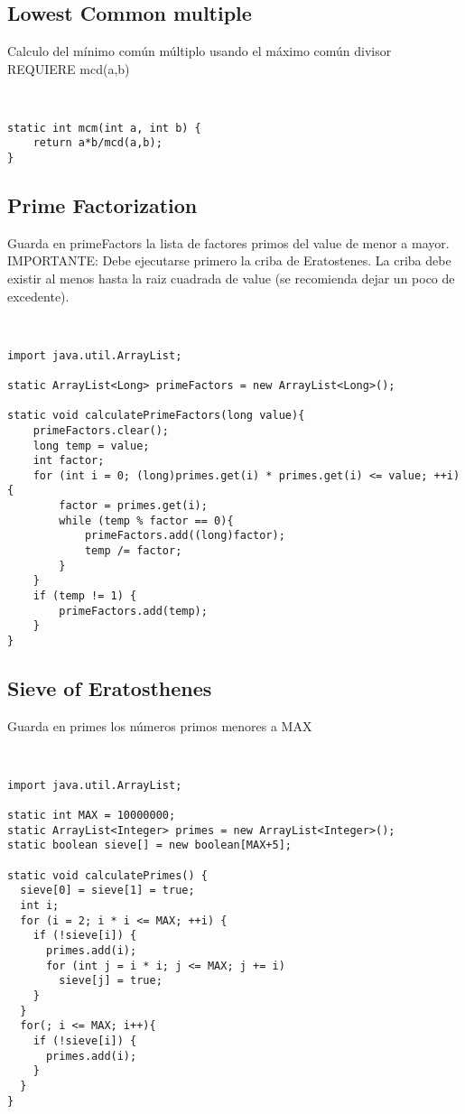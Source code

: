 \documentclass[11pt,letterpaper,twocolumn,twosided]{article}
\begin{document}
\subsection{Lowest Common multiple}
Calculo del m\'inimo com\'un m\'ultiplo usando el m\'aximo com\'un divisor REQUIERE mcd(a,b)
\begin{lstlisting}


static int mcm(int a, int b) {
	return a*b/mcd(a,b);
}
\end{lstlisting}

\subsection{Prime Factorization}
Guarda en primeFactors la lista de factores primos del value de menor a mayor. IMPORTANTE: Debe ejecutarse primero la criba de Eratostenes.  La criba debe existir al menos hasta la raiz cuadrada de value (se  recomienda dejar un poco de excedente).
\begin{lstlisting}


import java.util.ArrayList;

static ArrayList<Long> primeFactors = new ArrayList<Long>();

static void calculatePrimeFactors(long value){
	primeFactors.clear();
	long temp = value;
	int factor;
	for (int i = 0; (long)primes.get(i) * primes.get(i) <= value; ++i){
		factor = primes.get(i);
		while (temp % factor == 0){
			primeFactors.add((long)factor);
			temp /= factor;
		}
	}
	if (temp != 1) {
		primeFactors.add(temp);
	}
}
\end{lstlisting}

\subsection{Sieve of Eratosthenes}
Guarda en primes los n\'umeros primos menores a MAX
\begin{lstlisting}


import java.util.ArrayList;

static int MAX = 10000000;
static ArrayList<Integer> primes = new ArrayList<Integer>();
static boolean sieve[] = new boolean[MAX+5];
	
static void calculatePrimes() {
  sieve[0] = sieve[1] = true;
  int i;
  for (i = 2; i * i <= MAX; ++i) {
    if (!sieve[i]) {
      primes.add(i);
      for (int j = i * i; j <= MAX; j += i)
        sieve[j] = true;
    }
  }
  for(; i <= MAX; i++){
  	if (!sieve[i]) {
      primes.add(i);
    }
  }
}
\end{lstlisting}
\end{document}
